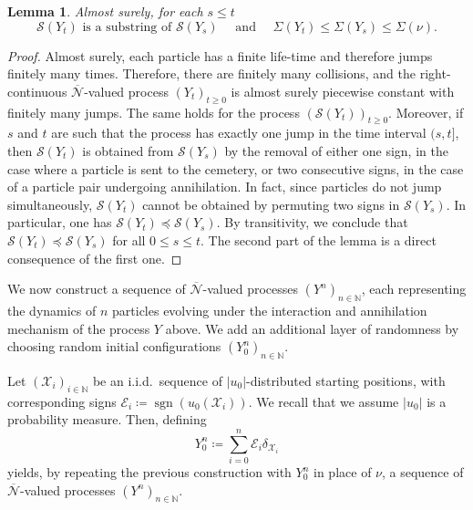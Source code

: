 \documentclass[12pt,reqno,oneside]{amsart}
\numberwithin{equation}{section}
\newtheorem{lemma}[theorem]{Lemma}
\theoremstyle{definition}
\theoremstyle{remark}
\newcommand{\N}{\mathbb{N}}
\DeclareMathOperator{\sgn}{sgn}
\begin{document}
\begin{lemma}
  \label{lemma:zero-crossings}
  Almost surely, for each $s \leq t$
  \begin{equation*}
    \mathcal{S}(Y_t) \text{ is a substring of } \mathcal{S}(Y_s)
    \quad \text{ and } \quad
    \Sigma(Y_t) \leq \Sigma(Y_s) \leq \Sigma(\nu).
  \end{equation*}
\end{lemma}

\begin{proof}
  Almost surely, each particle has a finite life-time and therefore jumps
  finitely many times. Therefore, there are finitely many collisions, and the
  right-continuous $\overline{\mathcal{N}}$-valued process $(Y_t)_{t \geq 0}$
  is almost surely piecewise constant with finitely many jumps. The same
  holds for the process $(\mathcal{S}(Y_t))_{t \geq 0}$. Moreover, if $s$ and
  $t$ are such that the process has exactly one jump in the time interval
  $(s,t]$, then $\mathcal{S}(Y_t)$ is  obtained from $\mathcal{S}(Y_s)$ by
  the removal of either one sign, in the case where a particle is sent to the
  cemetery, or two consecutive signs, in the case of a particle pair
  undergoing annihilation. In fact, since particles do not jump
  simultaneously, $\mathcal{S}(Y_t)$ cannot be obtained by permuting two
  signs in $\mathcal{S}(Y_s)$. In particular, one has
  $\mathcal{S}(Y_t) \preceq \mathcal{S}(Y_s)$. By transitivity, we conclude
  that $\mathcal{S}(Y_t) \preceq \mathcal{S}(Y_s)$ for all $0 \leq s \leq t$.
  The second part of the lemma is a direct consequence of the first one.
\end{proof}

We now construct a sequence of $\overline{\mathcal{N}}$-valued processes
$(Y^n)_{n \in \N}$, each representing the dynamics of $n$ particles evolving
under the interaction and annihilation mechanism of the process $Y$ above. We
add an additional layer of randomness by choosing random initial
configurations $(Y_0^n)_{n \in \N}$.

Let $(\mathcal{X}_i)_{i \in \N}$ be an i.i.d.~sequence of $|u_0|$-distributed
starting positions, with corresponding signs
$\mathcal{E}_i\coloneq\sgn(u_0(\mathcal{X}_i))$. We recall that we assume  $|u_0|$
is a probability measure. Then, defining
\begin{equation*}
  Y_0^n\coloneq \sum_{i=0}^n \mathcal{E}_i \delta_{\mathcal{X}_i}
\end{equation*}
yields, by repeating the previous construction with $Y_0^n$ in place of
$\nu$, a sequence of $\overline{\mathcal{N}}$-valued processes
$(Y^n)_{n \in \N}$.
\end{document}
